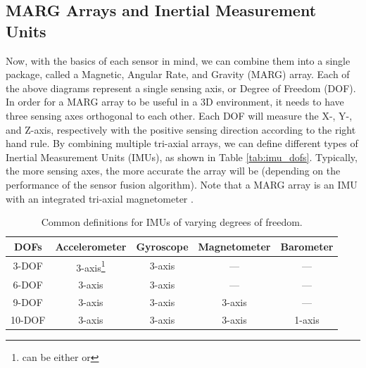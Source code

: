 \subsection{MARG Arrays and Inertial Measurement Units} 
Now, with the basics of each sensor in mind, we can combine them into a single package, called a Magnetic, Angular Rate, and Gravity (MARG) array.
Each of the above diagrams represent a single sensing axis, or Degree of Freedom (DOF).
In order for a MARG array to be useful in a 3D environment, it needs to have three sensing axes orthogonal to each other.
Each DOF will measure the X-, Y-, and Z-axis, respectively with the positive sensing direction according to the right hand rule.
By combining multiple tri-axial arrays, we can define different types of Inertial Measurement Units (IMUs), as shown in Table \ref{tab:imu_dofs}.
Typically, the more sensing axes, the more accurate the array will be (depending on the performance of the sensor fusion algorithm).
Note that a MARG array is an IMU with an integrated tri-axial magnetometer .

\begin{table}[h]
    \caption{Common definitions for IMUs of varying degrees of freedom.}
    \centering
    \begin{tabular}{| c | c | c | c | c |}
        \hline
        DOFs & Accelerometer & Gyroscope & Magnetometer & Barometer \\
        \hline
        3-DOF & 3-axis\footnote{can be either or} & 3-axis\footnotemark[\value{footnote}] & --- & --- \\
        6-DOF & 3-axis & 3-axis & --- & --- \\
        9-DOF & 3-axis & 3-axis & 3-axis & --- \\
        10-DOF & 3-axis & 3-axis & 3-axis & 1-axis \\
        \hline
    \end{tabular}
\end{table}

